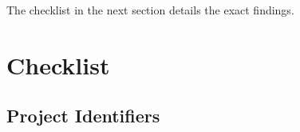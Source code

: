 \documentclass{report}
\begin{document}
The checklist in the next section details the exact findings.
\newpage 

\section*{Checklist}
		\subsection*{Project Identifiers}


\newcommand{\makerow}[1]{%
 #1 &
 \stepcounter{row}%
 \mbox{\CheckBox[print,name=YES\therow, width=0.7em, height=0.7em]{}} &
 \mbox{\CheckBox[print,name=NO\therow, width=0.7em, height=0.7em]{}} &
 \mbox{\CheckBox[print,name=N/A\therow, width=0.7em, height=0.7em]{}} \\
}
\end{document}
